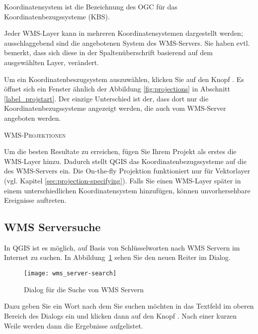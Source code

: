 Koordinatensystem ist die Bezeichnung des OGC für das
Koordinatenbezugssysteme (KBS).

Jeder WMS-Layer kann in mehreren Koordinatensystemen dargestellt werden;
ausschlaggebend sind die angebotenen System des WMS-Servers.
Sie haben evtl. bemerkt, dass sich diese in der Spaltenüberschrift
basierend auf dem ausgewählten Layer, verändert.

Um ein Koordinatenbeszugsystem auszuwählen, klicken Sie auf den Knopf
. Es öffnet sich ein Fenster ähnlich der Abbildung
\ref{fig:projections} in Abschnitt \ref{label_projstart}. Der einzige
Unterschied ist der, dass dort nur die Koordinatenbezugssysteme angezeigt
werden, die auch vom WMS-Server angeboten werden.

\begin{Tip}[h]\caption{\textsc{WMS-Projektionen}}
Um die besten Resultate zu erreichen, fügen Sie Ihrem Projekt als
erstes die WMS-Layer hinzu. Dadurch stellt QGIS das Koordinatenbezugssysteme
auf die des WMS-Servers ein. Die On-the-fly Projektion funktioniert nur für
Vektorlayer (vgl. Kapitel \ref{sec:projection-specifying}).
Falls Sie einen WMS-Layer später in einem unterschiedlichen Koordinatensystem
hinzufügen, können unvorhersehbare Ereignisse auftreten.
\end{Tip}

\subsection{WMS Serversuche}\label{sec:serversearch}

In QGIS ist es möglich, auf Basis von Schlüsselworten nach
WMS Servern im Internet zu suchen. In Abbildung~\ref{fig:searchtab} sehen Sie
den neuen Reiter  im  Dialog.

\begin{figure}[ht]
  \begin{center}
        \caption{Dialog für die Suche von WMS Servern \nixcaption}\label{fig:searchtab}
        \texttt{[image: wms\_server-search]}
  \end{center}
\end{figure}

Dazu geben Sie ein Wort nach dem Sie suchen möchten in das Textfeld im
oberen Bereich des Dialogs ein und klicken dann auf den Knopf
. Nach einer kurzen Weile werden dann die Ergebnisse
aufgelistet. 

